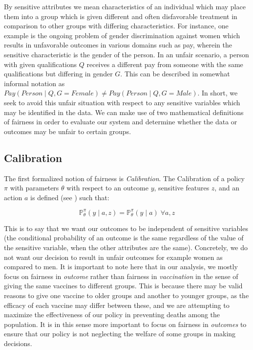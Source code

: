 \documentclass{article}
\begin{document}
By sensitive attributes we mean characteristics of an individual which may place them into a group which is given different and often disfavorable treatment in comparison to other groups with differing characteristics. For instance, one example is the ongoing problem of gender discrimination against women which results in unfavorable outcomes in various domains such as pay, wherein the sensitive characteristic is the gender of the person. In an unfair scenario, a person with given qualifications $Q$ receives a different pay from someone with the same qualifications but differing in gender $G$. This can be described in somewhat informal notation as $Pay(Person\;|\;Q,G=Female) \neq Pay(Person\;|\;Q,G=Male)$. In short, we seek to avoid this unfair situation with respect to any sensitive variables which may be identified in the data. We can make use of two mathematical definitions of fairness in order to evaluate our system and determine whether the data or outcomes may be unfair to certain groups.

\subsection{Calibration}
\label{sec: Calibration}
The first formalized notion of fairness is \textit{Calibration}. The Calibration of a policy $\pi$ with parameters $\theta$ with respect to an outcome $y$, sensitive features $z$, and an action $a$ is defined (see \textcolor{blue}{\cite{Dimitrakakis}}) such that: 

\begin{equation}
\label{eq: Calibration}
    \mathbb{P}^\pi_\theta(y\;|\;a,z) = \mathbb{P}^\pi_\theta(y\;|\;a) \; \forall a, z
\end{equation}

This is to say that we want our outcomes to be independent of sensitive variables (the conditional probability of an outcome is the same regardless of the value of the sensitive variable, when the other attributes are the same). Concretely, we do not want our decision to result in unfair outcomes for example women as compared to men. It is important to note here that in our analysis, we mostly focus on fairness in \textit{outcome} rather than fairness in \textit{vaccination} in the sense of giving the same vaccines to different groups. This is because there may be valid reasons to give one vaccine to older groups and another to younger groups, as the efficacy of each vaccine may differ between these, and we are attempting to maximize the effectiveness of our policy in preventing deaths among the population. It is in this sense more important to focus on fairness in \textit{outcomes} to ensure that our policy is not neglecting the welfare of some groups in making decisions.
\end{document}

